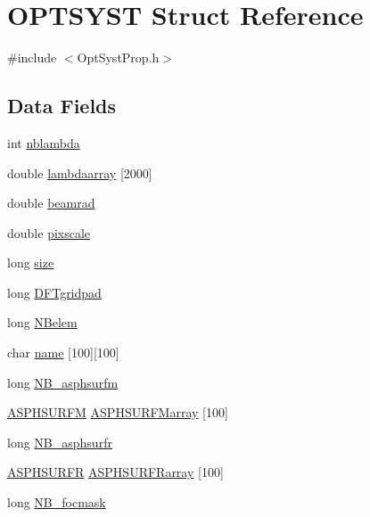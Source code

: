 \hypertarget{structOPTSYST}{\section{O\+P\+T\+S\+Y\+S\+T Struct Reference}
\label{structOPTSYST}
}


{\ttfamily \#include $<$Opt\+Syst\+Prop.\+h$>$}

\subsection*{Data Fields}
\begin{DoxyCompactItemize}
\item 
int \hyperlink{structOPTSYST_a984f1bc6e335c6ca935a7a4abc960351}{nblambda}
\item 
double \hyperlink{structOPTSYST_a9f5a2937870ef43b04a57760a513a978}{lambdaarray} \mbox{[}2000\mbox{]}
\item 
double \hyperlink{structOPTSYST_a10d097a25c01cbe9263690707182f0c8}{beamrad}
\item 
double \hyperlink{structOPTSYST_aa64373d953735e7fc898f664706ae434}{pixscale}
\item 
long \hyperlink{structOPTSYST_a1ca7a42369dc6bf1567dbeb3028c8a2a}{size}
\item 
long \hyperlink{structOPTSYST_ad30b68bcbf477c2e7348e9452a8d1693}{D\+F\+Tgridpad}
\item 
long \hyperlink{structOPTSYST_ab9532e90f1fa8a506d6316eac6dfd5ce}{N\+Belem}
\item 
char \hyperlink{structOPTSYST_a9004e8feaed3d42230bc476069d1e84d}{name} \mbox{[}100\mbox{]}\mbox{[}100\mbox{]}
\item 
long \hyperlink{structOPTSYST_a42bf1a88cf3bc234c3ff551f7094be9e}{N\+B\+\_\+asphsurfm}
\item 
\hyperlink{structASPHSURFM}{A\+S\+P\+H\+S\+U\+R\+F\+M} \hyperlink{structOPTSYST_a92f2ea6132e093b6c852fdd1c829ebd3}{A\+S\+P\+H\+S\+U\+R\+F\+Marray} \mbox{[}100\mbox{]}
\item 
long \hyperlink{structOPTSYST_a1d1453dfab2f1a7d2cbd8c1a0f6b0174}{N\+B\+\_\+asphsurfr}
\item 
\hyperlink{structASPHSURFR}{A\+S\+P\+H\+S\+U\+R\+F\+R} \hyperlink{structOPTSYST_ad7660585b3ec010a228cfdc35ece1ca4}{A\+S\+P\+H\+S\+U\+R\+F\+Rarray} \mbox{[}100\mbox{]}
\item 
long \hyperlink{structOPTSYST_a70fa5cf6b8805eecaa3c31e982273c02}{N\+B\+\_\+focmask}
\item 

\end{DoxyCompactItemize}
